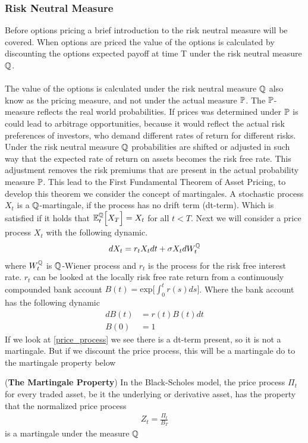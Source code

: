 \subsubsection{Risk Neutral Measure} \label{risk_neutral_section}
Before options pricing a brief introduction to the risk neutral measure will be covered.
When options are priced the value of the options is calculated by discounting 
the options expected payoff at time T under the risk neutral measure $\mathbb{Q}$. 
\\\\
The value of the options is calculated under the risk neutral measure $\mathbb{Q}$ also know as the pricing measure, and 
not under the actual measure $\mathbb{P}$. The $\mathbb{P}$- measure reflects the real world probabilities. If prices was determined 
under $\mathbb{P}$ is could lead to arbitrage opportunities, because it would reflect the actual risk preferences of
investors, who demand different rates of return for different risks. Under the risk neutral measure $\mathbb{Q}$  
probabilities are shifted or adjusted in such way that the expected rate of return on assets becomes the risk free rate. 
This adjustment removes the risk premiums that are present in the actual probability measure $\mathbb{P}$.
This lead to the First Fundamental Theorem of Asset Pricing, to develop this theorem we consider 
the concept of martingales. 
A stochastic process $X_t$ is a $\mathbb{Q}$-martingale, if the process has no drift term (dt-term). Which is satisfied if it holds that
$\mathbb{E}_{t}^{\mathbb{Q}}\Big[X_T\Big] = X_t$ for all $t<T$. Next we will consider a price process $X_t$ with the following dynamic.
\begin{align}
    d X_t = r_t X_t dt + \sigma X_t d W_{t}^{\mathbb{Q}}
    \label{price_process}
\end{align}
where $W_{t}^{\mathbb{Q}}$ is $\mathbb{Q}$-Wiener process and  $r_t$ is the process for the risk free interest rate. $r_t$ can be looked at the locally risk free rate return 
from a continuously compounded bank account $B(t)= \text{exp} \Big[\int_{0}^{t}r(s)ds \Big]$.
Where the bank account has the following dynamic
\begin{align}
    dB(t) &= r(t)B(t) dt \label{bank1}\\
    B(0) & = 1 \label{bank2}
\end{align}
If we look at \autoref{price_process} we see there is a dt-term present, so it is not a martingale.
But if we discount the price process, this will be a martingale do to the martingale property below
\begin{proposition}
    (\textbf{The Martingale Property}) In the Black-Scholes model, the price process $\Pi_t$
    for every traded asset, be it the underlying or derivative asset, has the property that the normalized price process
    \begin{align*}
        Z_t = \frac{\Pi_t}{B_T}
    \end{align*}
    is a martingale under the measure $\mathbb{Q}$ \cite{Bjork}
\end{proposition}
